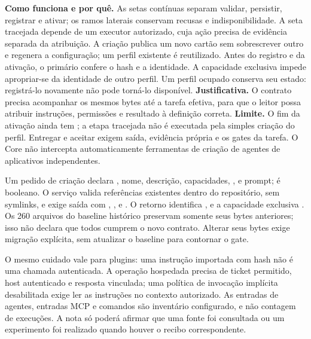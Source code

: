\begin{descricao}
\textbf{Como funciona e por quê.} As setas contínuas separam validar, persistir,
registrar e ativar; os ramos laterais conservam recusas e indisponibilidade.
A seta tracejada depende de um executor autorizado, cuja ação precisa de
evidência separada da atribuição. A criação publica um novo cartão sem
sobrescrever outro e regenera a
configuração; um perfil existente é reutilizado. Antes do registro e da
ativação, o primário confere o hash e a identidade. A capacidade exclusiva
impede apropriar-se da identidade de outro perfil. Um perfil ocupado conserva
seu estado: registrá-lo novamente não pode torná-lo disponível.
\textbf{Justificativa.} O contrato precisa acompanhar os mesmos bytes até a
tarefa efetiva, para que o leitor possa atribuir instruções, permissões e
resultado à definição correta.
\textbf{Limite.} O fim da ativação ainda tem ; a etapa
tracejada não é executada pela simples criação do perfil. Entregar e aceitar
exigem saída, evidência própria e os gates da tarefa. O Core não intercepta automaticamente
ferramentas de criação de agentes de aplicativos independentes.
\end{descricao}

\begin{arquitetura}
Um pedido de criação declara , nome, descrição, capacidades,
,  e prompt;  é booleano.
O serviço valida referências existentes dentro do repositório, sem symlinks,
e exige saída com , ,  e
. O retorno identifica ,
 e a capacidade exclusiva .
Os 260 arquivos do baseline histórico preservam somente seus bytes anteriores;
isso não declara que todos cumprem o novo contrato. Alterar seus bytes exige
migração explícita, sem atualizar o baseline para contornar o gate.
\end{arquitetura}

O mesmo cuidado vale para plugins: uma instrução importada com hash não é
uma chamada autenticada. A operação hospedada precisa de ticket permitido,
host autenticado e resposta vinculada; uma política de invocação implícita
desabilitada exige ler as instruções no contexto autorizado. As
\CoreAgentCount{} entradas de agentes, \CoreMCPCount{} entradas MCP e
\CoreCommandCount{} comandos são inventário configurado, e não contagem de
execuções. A nota só poderá afirmar que uma fonte foi consultada ou um
experimento foi realizado quando houver o recibo correspondente.

